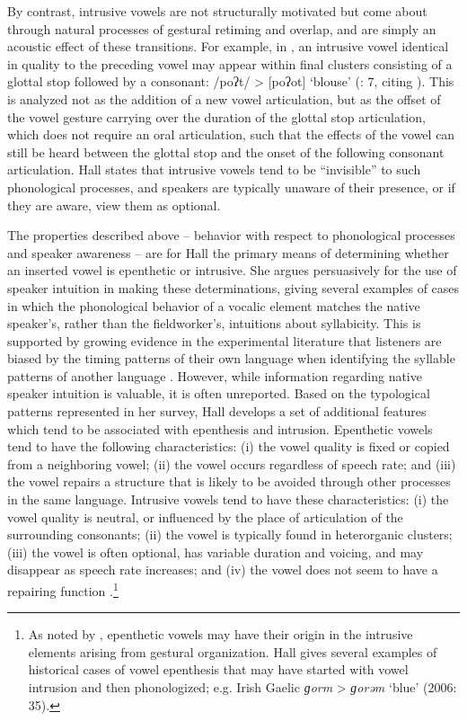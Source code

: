  By contrast, intrusive vowels are not structurally motivated but come about through natural processes of gestural retiming and overlap, and are simply an acoustic effect of these transitions. For example, in , an intrusive vowel identical in quality to the preceding vowel may appear within final clusters consisting of a glottal stop followed by a consonant: /poʔt/ > [poʔot] ‘blouse’ (\citealt{Hall2006}: 7, citing \citealt{Campbell1974}). This is analyzed not as the addition of a new vowel articulation, but as the offset of the vowel gesture carrying over the duration of the glottal stop articulation, which does not require an oral articulation, such that the effects of the vowel can still be heard between the glottal stop and the onset of the following consonant articulation. Hall states that intrusive vowels tend to be ``invisible'' to such phonological processes, and speakers are typically unaware of their presence, or if they are aware, view them as optional.

  The properties described above -- behavior with respect to phonological processes and speaker awareness -- are for Hall the primary means of determining whether an inserted vowel is epenthetic or intrusive. She argues persuasively for the use of speaker intuition in making these determinations, giving several examples of cases in which the phonological behavior of a vocalic element matches the native speaker’s, rather than the fieldworker’s, intuitions about syllabicity. This is supported by growing evidence in the experimental literature that listeners are biased by the timing patterns of their own language when identifying the syllable patterns of another language \citep{KwonEtAl2017}. However, while information regarding native speaker intuition is valuable, it is often unreported. Based on the typological patterns represented in her survey, Hall develops a set of additional features which tend to be associated with epenthesis and intrusion. Epenthetic vowels tend to have the following characteristics: (i) the vowel quality is fixed or copied from a neighboring vowel; (ii) the vowel occurs regardless of speech rate; and (iii) the vowel repairs a structure that is likely to be avoided through other processes in the same language. Intrusive vowels tend to have these characteristics: (i) the vowel quality is neutral, or influenced by the place of articulation of the surrounding consonants; (ii) the vowel is typically found in heterorganic clusters; (iii) the vowel is often optional, has variable duration and voicing, and may disappear as speech rate increases; and (iv) the vowel does not seem to have a repairing function \citep[391]{Hall2006}.\footnote{{As noted by \citet[53]{BrowmanGoldstein1992a}, epenthetic vowels may have their origin in the intrusive elements arising from gestural organization. Hall gives several examples of historical cases of vowel epenthesis that may have started with vowel intrusion and then phonologized; e.g. Irish Gaelic} \textrm{\textit{ɡorm}} > \textrm{\textit{ɡorəm}} \textrm{‘blue’ (2006: 35).}}

